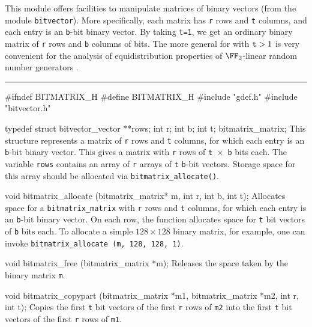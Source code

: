 
This module offers facilities to manipulate matrices of binary vectors  
(from the module \texttt{bitvector}).
More specifically, each matrix has {\tt r} rows and {\tt t} columns,
and each entry is an {\tt b}-bit binary vector.
By taking {\tt t=1}, we get an ordinary binary matrix of {\tt r} rows and 
{\tt b} columns of bits.
The more general for with ${\tt t} > 1$ is very convenient for the analysis of
equidistribution properties of $\FF_2$-linear random number generators 
\cite{rLEC05a,rLEC09a,rPAN04t}.

\bigskip\hrule

\code\hide
#ifndef BITMATRIX_H
#define BITMATRIX_H
\endhide
#include "gdef.h"
#include "bitvector.h"
\endcode

\code

typedef struct{
  bitvector_vector **rows;
  int r;
  int b;
  int t;
} bitmatrix_matrix;
\endcode
 \tab
This structure represents a matrix of {\tt r} rows and {\tt t} columns,
for which each entry is an {\tt b}-bit binary vector.
This gives a matrix with {\tt r} rows of {\tt t $\times$ b} bits each.
The variable {\tt rows} contains an array of {\tt r} arrays of {\tt t} {\tt b}-bit vectors.
Storage space for this array should be allocated via {\tt bitmatrix\_allocate()}.
\endtab
\code

void bitmatrix_allocate (bitmatrix_matrix* m, int r, int b, int t);
\endcode
\tab
Allocates space for a {\tt bitmatrix\_matrix} with {\tt r} rows and {\tt t} columns,
for which each entry is an {\tt b}-bit binary vector.
On each row, the function allocates space for {\tt t} bit vectors of {\tt b} bits each.
To allocate a simple $128 \times 128$ binary matrix, for example, one can invoke 
{\tt bitmatrix\_allocate (m, 128, 128, 1)}.  
\endtab
\code

void bitmatrix_free (bitmatrix_matrix *m);
\endcode
 \tab
 Releases the space taken by the binary matrix {\tt m}.
 \endtab
\code

void bitmatrix_copypart (bitmatrix_matrix *m1, bitmatrix_matrix *m2, 
                         int r, int t);
\endcode
 \tab
Copies the first {\tt t} bit vectors of the first {\tt r} rows of 
{\tt m2} into the first {\tt t} bit vectors of the first {\tt r} rows of {\tt m1}.
 \endtab
\code

